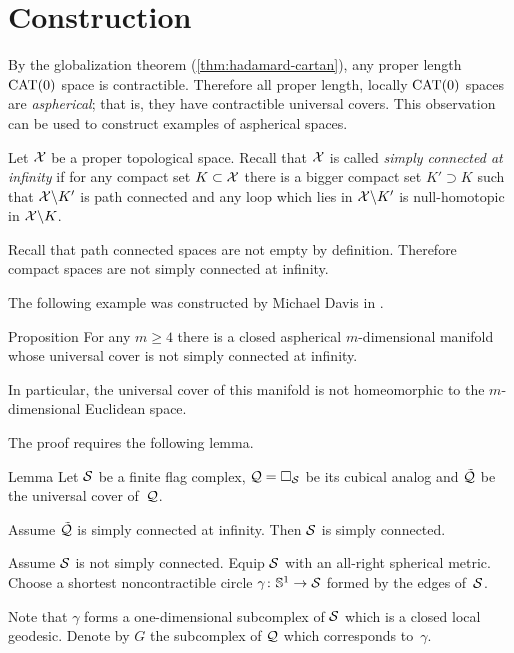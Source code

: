 \section{Construction}


By the globalization theorem (\ref{thm:hadamard-cartan}),
any proper length $\mathrm{CAT}(0)$ space is contractible.
Therefore all proper length, locally $\mathrm{CAT}(0)$ spaces 
are \emph{aspherical};
that is, they have contractible universal covers.
This observation can be used to construct examples of  aspherical spaces. 

Let $\mathcal{X}$ be a proper topological space.
Recall that $\mathcal{X}$ is called 
\emph{simply connected at infinity} 
if for any compact set $K\subset\mathcal{X}$
there is a bigger compact set $K'\supset K$
such that  $\mathcal{X}\backslash K'$ is path connected 
and any loop which lies in $\mathcal{X}\backslash K'$
is null-homotopic in  $\mathcal{X}\backslash K$.

Recall that path connected spaces are not empty by definition.
Therefore compact spaces are not simply connected at infinity.

The following example was constructed by Michael Davis in \cite{davis-1983}.

\begin{thm}{Proposition}\label{prop:aspherical}
For any  $m\ge 4$ there is a closed aspherical 
$m$-dimensional manifold whose universal cover is not simply connected at infinity.

In particular, the universal cover of this manifold 
is not homeomorphic to the $m$-dimensional Euclidean space.
\end{thm}

The proof requires the following lemma.

\begin{thm}{Lemma}\label{lem:example-pi_infty}
Let $\mathcal{S}$ be a finite flag complex,
$\mathcal{Q}=\square_{\mathcal{S}}$ be its cubical analog
and $\tilde{\mathcal{Q}}$ be the universal cover of~$\mathcal{Q}$.

Assume  $\tilde{\mathcal{Q}}$ is simply connected at infinity.
Then $\mathcal{S}$ is simply connected.
\end{thm}

Assume $\mathcal{S}$ is not simply connected. Equip $\mathcal{S}$ with an all-right spherical metric.
Choose a shortest noncontractible circle $\gamma\colon\mathbb{S}^1\to\mathcal{S}$ formed by the edges of~$\mathcal{S}$.

Note that $\gamma$ forms a one-dimensional subcomplex of $\mathcal{S}$ which is a closed local geodesic.
Denote by $G$ the subcomplex of $\mathcal{Q}$ which corresponds to~$\gamma$.

